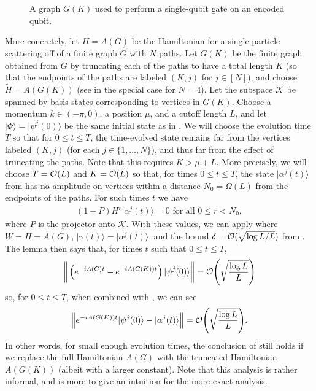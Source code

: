 \documentclass[../thesis-main/thesis-main]{subfiles}
\begin{document}
\begin{figure}
  \centering
  
  \caption[Single qubit $G(K)$]{A graph $G(K)$ used to perform a single-qubit gate on an encoded qubit. }
  \label{fig:single_qubit_scattering_graph}
\end{figure}

More concretely, let $H=A(G)$ be the Hamiltonian for a single particle scattering off of a finite graph $\widehat{G}$ with $N$ paths.  Let $G(K)$ be the finite graph obtained from $G$ by truncating each of the paths to have a total length $K$ (so that the endpoints of the paths are labeled $(K,j)$ for $j\in [N]$), and choose $\widetilde{H}=A(G(K))$ (see  in the special case for $N=4$). Let the subspace $\mathcal{K}$ be spanned by basis states corresponding to vertices in $G(K)$.  Choose a momentum $k\in (-\pi,0)$, a position $\mu$, and a cutoff length $L$, and let $|\Phi\rangle=|\psi^j(0)\rangle$ be the same initial state as in .  We will choose the evolution time $T$ so that for $0\leq t\leq T$, the time-evolved state remains far from the vertices labeled $(K,j)$ (for each $j\in\{1,\ldots,N\}$), and thus far from the effect of truncating the paths.  Note that this requires $K > \mu + L$.  More precisely, we will choose $T=\mathcal{O}(L)$ and $K = \mathcal{O}(L)$ so that, for times $0\leq t\leq T$, the state $|\alpha^j (t)\rangle$ from  has no amplitude on vertices within a distance $N_0=\Omega(L)$ from the endpoints of the paths. For such times $t$ we have
\begin{align}
\left(1-P\right)H^r |\alpha^j \left(t\right)\rangle=0 \text{ for all } 0\leq  r < N_0,
\end{align}
where $P$ is the projector onto $\mathcal{K}$.   With these values, we can apply  where $W=H=A(G)$, $|\gamma(t)\rangle=|\alpha^j(t)\rangle$, and the bound $\delta=\mathcal{O}(\sqrt{\log L/L})$ from . The lemma then says that, for times $t$ such that $0\leq t\leq T$,
\begin{equation}
  \bigg\Vert \left(e^{-iA(G) t}-e^{-iA(G(K))t}\right)|\psi^{j}(0)\rangle \bigg\Vert=\mathcal{O}\Bigg(\sqrt{\frac{\log L}{L}}\Bigg)
\end{equation}
so, for $0\leq t\leq T$, when combined with , we can see
\begin{align}
  \Big\Vert e^{-iA(G(K)) t}|\psi^{j}(0)\rangle-|\alpha^{j}(t)\rangle \Big\Vert =\mathcal{O}\Bigg(\sqrt{\frac{\log L}{L}}\Bigg).
    \label{eq:trunc_paths}
\end{align}
In other words, for small enough evolution times, the conclusion of  still holds if we replace the full Hamiltonian $A(G)$ with the truncated Hamiltonian $A(G(K))$ (albeit with a larger constant).  Note that this analysis is rather informal, and is more to give an intuition for the more exact analysis.
\end{document}
